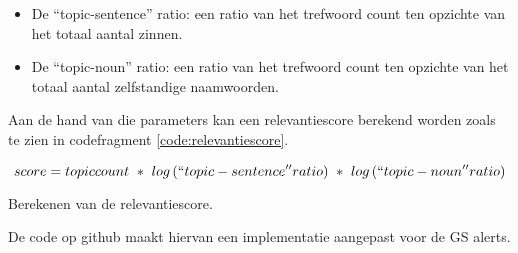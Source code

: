 \begin{itemize}
    \item De ``topic-sentence'' ratio: een ratio van het trefwoord count ten opzichte van het totaal aantal zinnen.
    \item De ``topic-noun'' ratio: een ratio van het trefwoord count ten opzichte van het totaal aantal zelfstandige naamwoorden.
\end{itemize}
Aan de hand van die parameters kan een relevantiescore berekend worden zoals te zien in codefragment \ref{code:relevantiescore}.
\begin{listing}[h!]
    \[
        score=topic count\ \ast\ log\left(``topic-sentence'' ratio\right)\ \ast\ log\left(``topic-noun'' ratio\right)
    \]  
    \caption[Relevantiescore]{Berekenen van de relevantiescore.}
    \label{code:relevantiescore}
\end{listing}
De code op github \textcite{Depaepenlp2025} maakt hiervan een implementatie aangepast voor de GS alerts.
